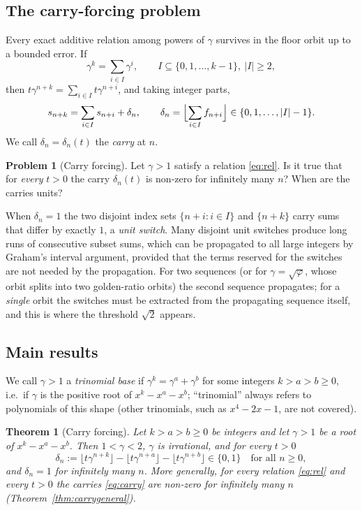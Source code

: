 \documentclass[11pt]{amsart}
\newtheorem{theorem}{Theorem}
\theoremstyle{definition}
\newtheorem{problem}[lemma]{Problem}
\theoremstyle{remark}
\newcommand{\fl}[1]{\lfloor #1\rfloor}
\begin{document}
\subsection{The carry-forcing problem}
Every exact additive relation among powers of $\gamma$ survives in the floor orbit up to a
bounded error. If
\begin{equation}\label{eq:rel}
  \gamma^k=\sum_{i\in I}\gamma^i,\qquad I\subseteq\{0,1,\dots,k-1\},\ |I|\ge2,
\end{equation}
then $t\gamma^{n+k}=\sum_{i\in I}t\gamma^{n+i}$, and taking integer parts,
\begin{equation}\label{eq:carry}
  s_{n+k}=\sum_{i\in I}s_{n+i}+\delta_n,\qquad
  \delta_n=\Bigl\lfloor\sum_{i\in I}f_{n+i}\Bigr\rfloor\in\{0,1,\dots,|I|-1\}.
\end{equation}
We call $\delta_n=\delta_n(t)$ the \emph{carry} at $n$.

\begin{problem}[Carry forcing]\label{prob:carry}
Let $\gamma>1$ satisfy a relation \eqref{eq:rel}. Is it true that for \emph{every} $t>0$
the carry $\delta_n(t)$ is non-zero for infinitely many $n$? When are the carries units?
\end{problem}

When $\delta_n=1$ the two disjoint index sets $\{n+i:i\in I\}$ and $\{n+k\}$ carry sums that
differ by exactly $1$, a \emph{unit switch}. Many disjoint unit switches produce long runs of
consecutive subset sums, which can be propagated to all large integers by Graham's interval
argument, provided that the terms reserved for the switches are not needed by the propagation.
For two sequences (or for $\gamma=\sqrt\varphi$, whose orbit splits into two golden-ratio orbits)
the second sequence propagates; for a \emph{single} orbit the switches must be extracted from the
propagating sequence itself, and this is where the threshold $\sqrt2$ appears.

\subsection{Main results}
We call $\gamma>1$ a \emph{trinomial base} if $\gamma^k=\gamma^a+\gamma^b$ for some integers
$k>a>b\ge0$, i.e.\ if $\gamma$ is the positive root of $x^k-x^a-x^b$; ``trinomial'' always refers
to polynomials of this shape (other trinomials, such as $x^4-2x-1$, are not covered).

\begin{theorem}[Carry forcing]\label{thm:A}
Let $k>a>b\ge0$ be integers and let $\gamma>1$ be a root of $x^k-x^a-x^b$. Then
$1<\gamma<2$, $\gamma$ is irrational, and for every $t>0$
\[
  \delta_n:=\fl{t\gamma^{n+k}}-\fl{t\gamma^{n+a}}-\fl{t\gamma^{n+b}}\in\{0,1\}
  \quad\text{for all }n\ge0,
\]
and $\delta_n=1$ for infinitely many $n$.
More generally, for every relation \eqref{eq:rel} and every $t>0$ the carries
\eqref{eq:carry} are non-zero for infinitely many $n$ (Theorem~\ref{thm:carrygeneral}).
\end{theorem}
\end{document}
